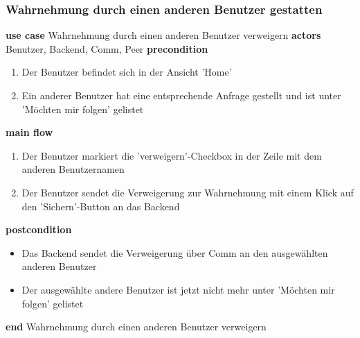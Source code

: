 \subsubsection{Wahrnehmung durch einen anderen Benutzer gestatten}\label{subsubsec:uc_denypeerfollowme}
\noindent \textbf{use case} Wahrnehmung durch einen anderen Benutzer verweigern \newline
\indent \textbf{actors} \newline
\indent \indent Benutzer, Backend, Comm, Peer \newline
\indent \textbf{precondition}
\begin{enumerate}[labelwidth=0pt,leftmargin=39pt,noitemsep,topsep=0pt,parsep=0pt,partopsep=0pt]
\item Der Benutzer befindet sich in der Ansicht 'Home'
\item Ein anderer Benutzer hat eine entsprechende Anfrage gestellt und ist unter 'Möchten mir folgen' gelistet
\end{enumerate}
\indent \indent \textbf{main flow}
\begin{enumerate}[labelwidth=0pt,leftmargin=39pt,noitemsep,topsep=0pt,parsep=0pt,partopsep=0pt]
\item Der Benutzer markiert die 'verweigern'-Checkbox in der Zeile mit dem anderen Benutzernamen
\item Der Benutzer sendet die Verweigerung zur Wahrnehmung mit einem Klick auf den 'Sichern'-Button an das Backend
\end{enumerate}
\indent \indent \textbf{postcondition}
\begin{itemize}[labelwidth=0pt,leftmargin=39pt,noitemsep,topsep=0pt,parsep=0pt,partopsep=0pt]
\item Das Backend sendet die Verweigerung über Comm an den ausgewählten anderen Benutzer
\item Der ausgewählte andere Benutzer ist jetzt nicht mehr unter 'Möchten mir folgen' gelistet
\end{itemize}
\noindent \textbf{end} Wahrnehmung durch einen anderen Benutzer verweigern \newline

